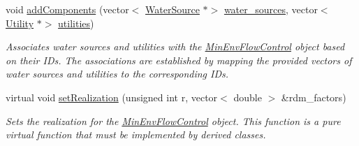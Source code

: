 \begin{DoxyCompactItemize}
void \mbox{\hyperlink{classMinEnvironFlowControl_a9dd9d33661f121dda9704288658ecf7e}{add\+Components}} (vector$<$ \mbox{\hyperlink{classWaterSource}{Water\+Source}} $\ast$$>$ \mbox{\hyperlink{classMinEnvironFlowControl_ac5be281d802ad1de433bed588bb13cfe}{water\+\_\+sources}}, vector$<$ \mbox{\hyperlink{classUtility}{Utility}} $\ast$$>$ \mbox{\hyperlink{classMinEnvironFlowControl_a6c43408d05901838fa567c8e23a37009}{utilities}})
\begin{DoxyCompactList}\small\item\em Associates water sources and utilities with the {\ttfamily \mbox{\hyperlink{classMinEnvFlowControl}{Min\+Env\+Flow\+Control}}} object based on their I\+Ds. The associations are established by mapping the provided vectors of water sources and utilities to the corresponding I\+Ds. \end{DoxyCompactList}\item 
virtual void \mbox{\hyperlink{classMinEnvironFlowControl_ae8ba384400c2d4302cefb9ca6eaec3a8}{set\+Realization}} (unsigned int r, vector$<$ double $>$ \&rdm\+\_\+factors)
\begin{DoxyCompactList}\small\item\em Sets the realization for the {\ttfamily \mbox{\hyperlink{classMinEnvFlowControl}{Min\+Env\+Flow\+Control}}} object. This function is a pure virtual function that must be implemented by derived classes. \end{DoxyCompactList}\end{DoxyCompactItemize}

